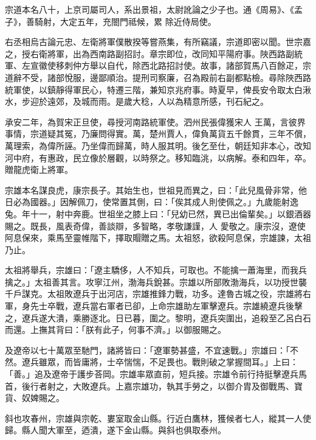 \begin{pinyinscope}
 宗道本名八十，上京司屬司人，系出景祖，太尉訛論之少子也。通《周易》、《孟子》，善騎射，大定五年，充閤門祗候，累
 除近侍局使。



 右丞相烏古論元忠、左衛將軍僕散揆等嘗燕集，有所竊議，宗道即密以聞。世宗嘉之，授右衛將軍，出為西南路副招討。章宗即位，改同知平陽府事。陜西路副統軍、左宣徽使移刺仲方舉以自代，除西北路招討使。故事，諸部賀馬八百餘疋，宗道辭不受，諸部悅服，邊鄙順治。提刑司察廉，召為殿前右副都點檢。尋除陜西路統軍使，以鎮靜得軍民心，特遷三階，兼知京兆府事。時夏早，俾長安令取太白湫水，步迎於遠郊，及城而雨。是歲大稔，人以為精意所感，刊石紀之。



 承安二年，為賀宋正旦使，尋授河南路統軍使。泗州民張偉獲宋人
 王萬，言彼界事情，宗道疑其冤，乃廉問得實。萬，楚州賈人，偉負萬貨五千餘貫，三年不償，萬理索，為偉所誣。乃坐偉而歸萬，時人服其明。後乞至仕，朝廷知非本心，改知河中府，有惠政，民立像於層觀，以時祭之。移知臨洮，以病解。泰和四年，卒。贈龍虎衛上將軍。



 宗雄本名謀良虎，康宗長子。其始生也，世祖見而異之，曰：「此兒風骨非常，他日必為國器。」因解佩刀，使常置其側，曰：「俟其成人則使佩之。」九歲能射逸兔。年十一，射中奔鹿。世祖坐之膝上曰：「兒幼已然，異已出倫輩矣。」以銀酒器賜之。既長，風表奇偉，善談辯，多智略，孝敬謙謹，人
 愛敬之。康宗沒，遼使阿息保來，乘馬至靈帷階下，擇取賵贈之馬。太祖怒，欲殺阿息保，宗雄諫，太祖乃止。



 太祖將舉兵，宗雄曰：「遼主驕侈，人不知兵，可取也。不能擒一蕭海里，而我兵擒之。」太祖善其言。攻寧江州，渤海兵銳甚。宗雄以所部敗渤海兵，以功授世襲千戶謀克。太祖敗遼兵于出河店，宗雄推鋒力戰，功多。達魯古城之役，宗雄將右軍，身先士卒戰，遼兵當右軍者已卻，上命宗雄助左軍擊遼兵。宗雄繞遼兵後擊之，遼兵遂大潰，乘勝逐北。日已暮，圍之。黎明，遼兵突圍出，追殺至乙呂白石而還。上撫其背曰：「朕有此子，何事不濟。」以御服賜之。



 及遼帝以七十萬眾至馳門，諸將皆曰：「遼軍勢甚盛，不宜速戰。」宗雄曰：「不然。遼兵雖眾，而皆庸將，士卒惴惴，不足畏也。戰則破之掌握間耳。」上曰：「善。」追及遼帝于護步荅岡。宗雄率眾直前，短兵接。宗雄令前行持挺擊遼兵馬首，後行者射之，大敗遼兵。上嘉宗雄功，執其手勞之，以御介胄及御戰馬、寶貨、奴婢賜之。



 斜也攻春州，宗雄與宗乾、婁室取金山縣。行近白鷹林，獲候者七人，縱其一人使歸。縣人聞大軍至，迺潰，遂下金山縣。與斜也俱取泰州。




\end{pinyinscope}
